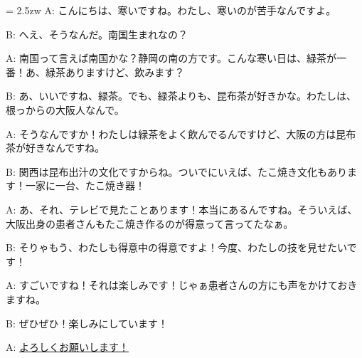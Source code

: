 \documentclass[11pt]{amsart}
\title{}
\author{}
\newenvironment{hangall}[1]{\hangindent = 2.5zw\everypar{\hangindent = 2.5zw}}{}
\begin{document}
\maketitle
\begin{hangall}{}%
A: こんにちは、寒いですね。わたし、寒いのが苦手なんですよ。

B: へえ、そうなんだ。南国生まれなの？

A: 南国って言えば南国かな？静岡の南の方です。こんな寒い日は、緑茶が一番！あ、緑茶ありますけど、飲みます？

B: あ、いいですね、緑茶。でも、緑茶よりも、昆布茶が好きかな。わたしは、根っからの大阪人なんで。

A: そうなんですか！わたしは緑茶をよく飲んでるんですけど、大阪の方は昆布茶が好きなんですね。

B: 関西は昆布出汁の文化ですからね。ついでにいえば、たこ焼き文化もあります！一家に一台、たこ焼き器！

A: あ、それ、テレビで見たことあります！本当にあるんですね。そういえば、大阪出身の患者さんもたこ焼き作るのが得意って言ってたなぁ。

B: そりゃもう、わたしも得意中の得意ですよ！今度、わたしの技を見せたいです！

A: すごいですね！それは楽しみです！じゃぁ患者さんの方にも声をかけておきますね。

B: ぜひぜひ！楽しみにしています！

A: \ul{よろしくお願いします！}\end{hangall}
\end{document}
